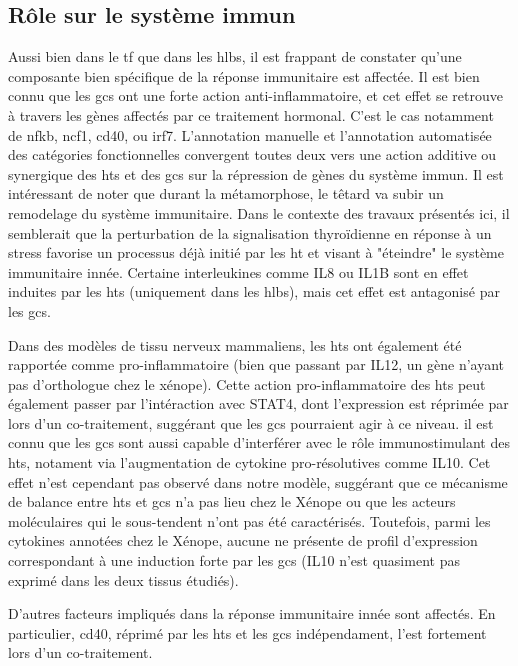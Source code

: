\documentclass[../main.tex]{subfiles}
\begin{document}
\subsection{Rôle sur le système immun}
Aussi bien dans le \gls{tf} que dans les \glspl{hlb}, il est frappant de constater qu'une composante bien spécifique de la réponse immunitaire est affectée.
Il est bien connu que les \glspl{gc} ont une forte action anti-inflammatoire, et cet effet se retrouve à travers les gènes affectés par ce traitement hormonal.
C'est le cas notamment de \gls{nfkb}, \gls{ncf1}, \gls{cd40}, ou \gls{irf7}.
L'annotation manuelle et l'annotation automatisée des catégories fonctionnelles convergent toutes deux vers une action additive ou synergique des \glspl{ht} et des \glspl{gc} sur la répression de gènes du système immun.
Il est intéressant de noter que durant la métamorphose, le têtard va subir un remodelage du système immunitaire.
Dans le contexte des travaux présentés ici, il semblerait que la perturbation de la signalisation thyroïdienne en réponse à un stress favorise un processus déjà initié par les \gls{ht} et visant à "éteindre" le système immunitaire innée.
Certaine interleukines comme IL8 ou IL1B sont en effet induites par les \glspl{ht} (uniquement dans les \glspl{hlb}), mais cet effet est antagonisé par les \glspl{gc}.
\par
Dans des modèles de tissu nerveux mammaliens, les \glspl{ht} ont également été rapportée comme pro-inflammatoire \citep{Tamura1999,Montesinos2012} (bien que passant par IL12, un gène n'ayant pas d'orthologue chez le xénope).
Cette action pro-inflammatoire des \glspl{ht} peut également passer par l'intéraction avec STAT4, dont l'expression est réprimée par lors d'un co-traitement, suggérant que les \glspl{gc} pourraient agir à ce niveau.
il est connu que les \glspl{gc} sont aussi capable d'interférer avec le rôle immunostimulant des \glspl{ht}, notament via l'augmentation de cytokine pro-résolutives comme IL10.
Cet effet n'est cependant pas observé dans notre modèle, suggérant que ce mécanisme de balance entre \glspl{ht} et \glspl{gc} n'a pas lieu chez le Xénope ou que les acteurs moléculaires qui le sous-tendent n'ont pas été caractérisés.
Toutefois, parmi les cytokines annotées chez le Xénope, aucune ne présente de profil d'expression correspondant à une induction forte par les \glspl{gc} (IL10 n'est quasiment pas exprimé dans les deux tissus étudiés).
\par
D'autres facteurs impliqués dans la réponse immunitaire innée sont affectés.
En particulier, \gls{cd40}, réprimé par les \glspl{ht} et les \glspl{gc} indépendament, l'est fortement lors d'un co-traitement.
\end{document}
